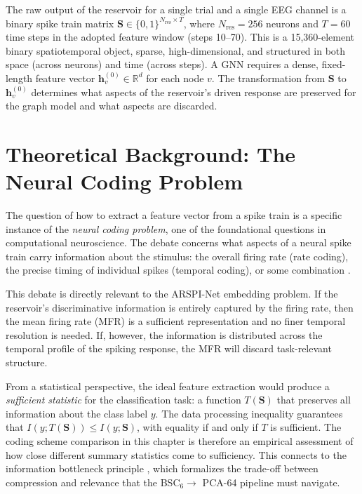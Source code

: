 The raw output of the reservoir for a single trial and a single EEG channel is a binary spike train matrix $\mathbf{S} \in \{0, 1\}^{N_{\text{res}} \times T}$, where $N_{\text{res}} = 256$ neurons and $T = 60$ time steps in the adopted feature window (steps 10--70). This is a 15,360-element binary spatiotemporal object, sparse, high-dimensional, and structured in both space (across neurons) and time (across steps). A GNN requires a dense, fixed-length feature vector $\mathbf{h}_v^{(0)} \in \mathbb{R}^d$ for each node $v$. The transformation from $\mathbf{S}$ to $\mathbf{h}_v^{(0)}$ determines what aspects of the reservoir's driven response are preserved for the graph model and what aspects are discarded.


\section{Theoretical Background: The Neural Coding Problem}
\label{sec:neural_coding_theory}

The question of how to extract a feature vector from a spike train is a specific instance of the \emph{neural coding problem}, one of the foundational questions in computational neuroscience. The debate concerns what aspects of a neural spike train carry information about the stimulus: the overall firing rate (rate coding), the precise timing of individual spikes (temporal coding), or some combination \cite{gerstner_spiking_2002, dayan2001, Rieke1997}.

This debate is directly relevant to the ARSPI-Net embedding problem. If the reservoir's discriminative information is entirely captured by the firing rate, then the mean firing rate (MFR) is a sufficient representation and no finer temporal resolution is needed. If, however, the information is distributed across the temporal profile of the spiking response, the MFR will discard task-relevant structure.

From a statistical perspective, the ideal feature extraction would produce a \emph{sufficient statistic} for the classification task: a function $T(\mathbf{S})$ that preserves all information about the class label $y$. The data processing inequality guarantees that $I(y; T(\mathbf{S})) \leq I(y; \mathbf{S})$, with equality if and only if $T$ is sufficient. The coding scheme comparison in this chapter is therefore an empirical assessment of how close different summary statistics come to sufficiency. This connects to the information bottleneck principle \cite{tishby_deep_2015}, which formalizes the trade-off between compression and relevance that the BSC$_6 \to$ PCA-64 pipeline must navigate.

